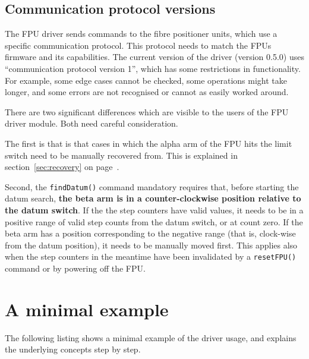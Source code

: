 \documentclass{scrartcl}[12pt,a4paper]
\begin{document}
\subsection{Communication protocol versions}

The FPU driver sends commands to the fibre positioner units, which use
a specific communication protocol. This protocol needs to match the
FPUs firmware and its capabilities. The current version of the driver
(version 0.5.0) uses ``communication protocol version 1'', which has
some restrictions in functionality. For example, some edge cases
cannot be checked, some operations might take longer, and some errors
are not recognised or cannot as easily worked around.

There are two significant differences which are visible to the users
of the FPU driver module. Both need careful consideration.

The first is that is that cases in which the alpha arm of the FPU hits
the limit switch need to be manually recovered from. This is explained
in section~\ref{sec:recovery} on page~\pageref{sec:recovery}.

Second, the \texttt{findDatum()} command mandatory requires that,
before starting the datum search, \textbf{the beta arm is in a
  counter-clockwise position relative to the datum switch}. If the
the step counters have valid values, it needs to be in a positive
range of valid step counts from the datum switch, or at count zero. If
the beta arm has a position corresponding to the negative range (that
is, clock-wise from the datum position), it needs to be manually moved
first.  This applies also when the step counters in the meantime have
been invalidated by a \texttt{resetFPU()} command or by powering off the
FPU.


\section{A minimal example}
\label{sec:minimalexample}
The following listing shows a minimal example of the
driver usage, and explains the underlying concepts
step by step.
\end{document}
